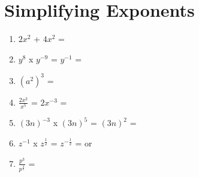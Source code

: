 \documentclass{article}
\begin{document}
\section{Simplifying Exponents}
\begin{enumerate}
    \itemsep1.0em
    \item {$2x^2$ + $4x^2$ = }
    
    \item {$y^8$ x $y^{-9}$ = $y^{-1}$ = }
    
    \item {$(a^2)^3$ = }
    
    \item {$\frac{2x^2}{x^5}$ = $2x^{-3}$ = }
    
    \item {$(3n)^{-3}$ x $(3n)^5$ = $(3n)^2$ = }
    
    \item {$z^{-1}$ x $z^\frac{1}{2}$ = $z^{-\frac{1}{2}}$ =  or }
    
    \item {$\frac{p^3}{p^\frac{4}{5}}$ = }
    
\end{enumerate}
\end{document}
